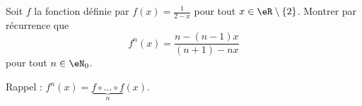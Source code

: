 \begin{exercice}\label{exoJanvier008}

Soit $f$ la fonction définie par $f(x)=\frac{1}{ 2-x }$ pour tout $x\in\eR\setminus\{ 2 \}$. Montrer par récurrence que
\begin{equation}
	f^n(x)=\frac{ n-(n-1)x }{ (n+1)-nx }
\end{equation}
pour tout $n\in\eN_0$.

Rappel : $f^n(x)=\underbrace{f\circ\ldots\circ f}_{n}(x)$.

\end{exercice}
